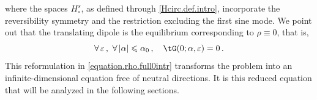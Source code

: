 \documentclass[a4paper,reqno,10pt]{article}
\begin{document}
where the spaces $H^s_{\circ}$, as defined through \eqref{Hcirc.def.intro}, incorporate the reversibility symmetry and 
the restriction excluding the first sine mode. We point out that the translating dipole is the equilibrium corresponding to $\rho\equiv 0$, that is,
\begin{equation}
    \forall\, \varepsilon\,, \  \forall \,|\alpha|\leqslant\alpha_0\,, \quad \tG(0;\alpha,\varepsilon)=0 \,.
\end{equation}
This reformulation in \eqref{equation.rho.full0intr} transforms the problem into an infinite-dimensional equation free of neutral directions. It is this reduced equation that will be analyzed in the following sections.



\end{document}
